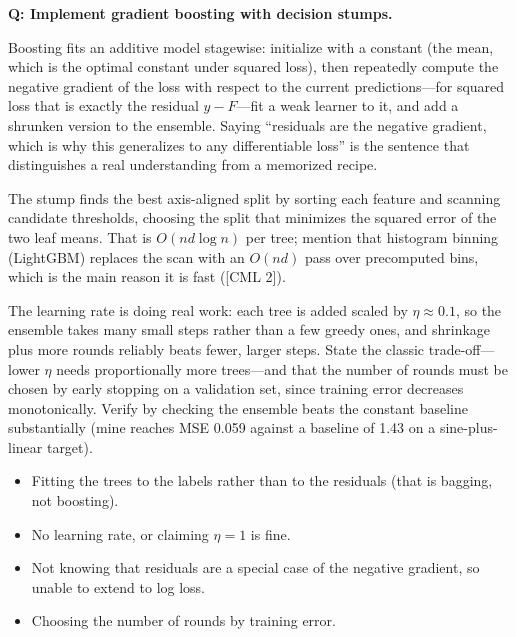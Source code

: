 \begin{interviewq}
\textbf{Q: Implement gradient boosting with decision stumps.}

 \quad {} \quad \badgefreq{\freqmed}

\stronganswer

Boosting fits an additive model stagewise: initialize with a constant (the mean, which is the optimal constant under squared loss), then repeatedly compute the negative gradient of the loss with respect to the current predictions---for squared loss that is exactly the residual $y - F$---fit a weak learner to it, and add a shrunken version to the ensemble. Saying ``residuals are the negative gradient, which is why this generalizes to any differentiable loss'' is the sentence that distinguishes a real understanding from a memorized recipe.

The stump finds the best axis-aligned split by sorting each feature and scanning candidate thresholds, choosing the split that minimizes the squared error of the two leaf means. That is $O(nd\log n)$ per tree; mention that histogram binning (LightGBM) replaces the scan with an $O(nd)$ pass over precomputed bins, which is the main reason it is fast ([CML 2]).

The learning rate is doing real work: each tree is added scaled by $\eta \approx 0.1$, so the ensemble takes many small steps rather than a few greedy ones, and shrinkage plus more rounds reliably beats fewer, larger steps. State the classic trade-off---lower $\eta$ needs proportionally more trees---and that the number of rounds must be chosen by early stopping on a validation set, since training error decreases monotonically. Verify by checking the ensemble beats the constant baseline substantially (mine reaches MSE 0.059 against a baseline of 1.43 on a sine-plus-linear target).

\redflags
\begin{itemize}
    \item Fitting the trees to the labels rather than to the residuals (that is bagging, not boosting).
    \item No learning rate, or claiming $\eta = 1$ is fine.
    \item Not knowing that residuals are a special case of the negative gradient, so unable to extend to log loss.
    \item Choosing the number of rounds by training error.
\end{itemize}



\end{interviewq}

